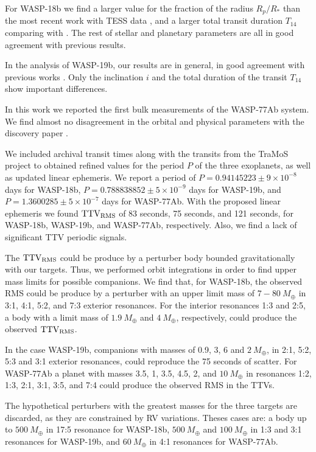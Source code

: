 For WASP-18b we find a larger value for the fraction of the radius $R_p/R_*$ than the most recent work with TESS data \cite{Shporer2018}, and a larger total transit duration $T_{14}$ comparing with \cite{Hellier2009}. The rest of stellar and planetary parameters are all in good agreement with previous results.

In the analysis of WASP-19b, our results are in general, in good agreement with previous works \citep{Hebb2010,Lendl2013}. Only the inclination $i$ and the total duration of the transit $T_{14}$ show important differences. 

In this work we reported the first bulk measurements of the WASP-77Ab system. We find almost no disagreement in the orbital and physical parameters with the discovery paper \cite{Maxted2013}.

We included archival transit times along with the transits from the TraMoS project to obtained refined values for the period $P$ of the three exoplanets, as well as updated linear ephemeris. We report a period of $P=0.94145223\pm9\times10^{-8}$ days for WASP-18b, $P=0.788838852\pm5\times10^{-9}$ days for WASP-19b, and $P=1.3600285\pm5\times10^{-7}$ days for WASP-77Ab. With the proposed linear ephemeris we found $\rm TTV_{RMS}$ of 83 seconds, 75 seconds, and 121 seconds, for WASP-18b, WASP-19b, and WASP-77Ab, respectively. Also, we find a lack of significant TTV periodic signals.  

The $\rm TTV_{RMS}$ could be produce by a perturber body bounded gravitationally with our targets. Thus, we performed orbit integrations in order to find upper mass limits for possible companions. We find that, for WASP-18b, the observed RMS could be produce by a perturber with an upper limit mass of $7-80~M_{\oplus}$ in 3:1, 4:1, 5:2, and 7:3 exterior resonances. For the interior resonances 1:3 and 2:5, a body with a limit mass of $1.9~M_{\oplus}$ and $4~M_{\oplus}$, respectively, could produce the observed $\rm TTV_{RMS}$.

In the case WASP-19b, companions with masses of  0.9, 3, 6 and $2~M_{\oplus}$, in 2:1, 5:2, 5:3 and 3:1 exterior resonances, could reproduce the 75 seconds of scatter. For WASP-77Ab a planet with masses 3.5, 1, 3.5, 4.5, 2, and $10~M_{\oplus}$ in resonances 1:2, 1:3, 2:1, 3:1, 3:5, and 7:4 could produce the observed RMS in the TTVs.

The hypothetical perturbers with the greatest masses for the three targets are discarded, as they are constrained by RV variations. Theses cases are: a body up to $500~M_{\oplus}$ in 17:5 resonance for WASP-18b, $500~M_{\oplus}$ and $100~M_{\oplus}$ in 1:3 and 3:1 resonances for WASP-19b, and $60~M_{\oplus}$ in 4:1 resonances for WASP-77Ab.

